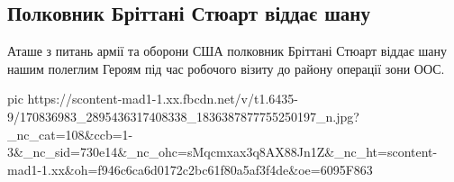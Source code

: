  
 
 
 
 
\subsection{Полковник Бріттані Стюарт віддає шану}
\label{sec:09_04_2021.fb.makarenko_oksana.1.usa_vojna_mogila}

Аташе з питань армії та оборони США полковник Бріттані Стюарт віддає шану нашим
полеглим Героям під час робочого візиту до району операції зони ООС.


\ifcmt
  pic https://scontent-mad1-1.xx.fbcdn.net/v/t1.6435-9/170836983_2895436317408338_1836387877755250197_n.jpg?_nc_cat=108&ccb=1-3&_nc_sid=730e14&_nc_ohc=sMqcmxax3q8AX88Jn1Z&_nc_ht=scontent-mad1-1.xx&oh=f946c6ca6d0172c2bc61f80a5af3f4de&oe=6095F863
\fi

